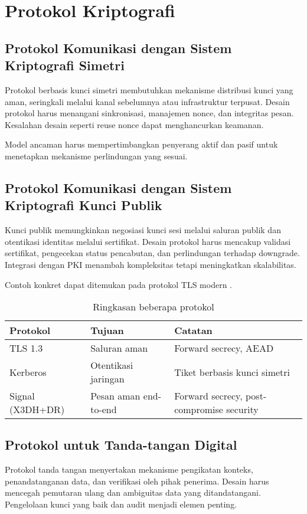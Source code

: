 \documentclass[../main.tex]{subfiles}
\begin{document}
\chapter{Protokol Kriptografi}

\section{Protokol Komunikasi dengan Sistem Kriptografi Simetri}
Protokol berbasis kunci simetri membutuhkan mekanisme distribusi kunci yang aman, seringkali melalui kanal sebelumnya atau infrastruktur terpusat. Desain protokol harus menangani sinkronisasi, manajemen nonce, dan integritas pesan. Kesalahan desain seperti reuse nonce dapat menghancurkan keamanan.

Model ancaman harus mempertimbangkan penyerang aktif dan pasif untuk menetapkan mekanisme perlindungan yang sesuai.

\section{Protokol Komunikasi dengan Sistem Kriptografi Kunci Publik}
Kunci publik memungkinkan negosiasi kunci sesi melalui saluran publik dan otentikasi identitas melalui sertifikat. Desain protokol harus mencakup validasi sertifikat, pengecekan status pencabutan, dan perlindungan terhadap downgrade. Integrasi dengan PKI menambah kompleksitas tetapi meningkatkan skalabilitas.

Contoh konkret dapat ditemukan pada protokol TLS modern \parencite{rfc8446}.

\begin{table}[h]
\centering
\caption{Ringkasan beberapa protokol}
\label{tab:protokol}
\begin{tabular}{lll}
\toprule
Protokol & Tujuan & Catatan \\
\midrule
TLS 1.3 & Saluran aman & Forward secrecy, AEAD \parencite{rfc8446} \\
Kerberos & Otentikasi jaringan & Tiket berbasis kunci simetri \parencite{rfc4120} \\
Signal (X3DH+DR) & Pesan aman end-to-end & Forward secrecy, post-compromise security \parencite{signal-dr,x3dh} \\
\bottomrule
\end{tabular}
\end{table}

\section{Protokol untuk Tanda-tangan Digital}
Protokol tanda tangan menyertakan mekanisme pengikatan konteks, penandatanganan data, dan verifikasi oleh pihak penerima. Desain harus mencegah pemutaran ulang dan ambiguitas data yang ditandatangani. Pengelolaan kunci yang baik dan audit menjadi elemen penting.
\end{document}
